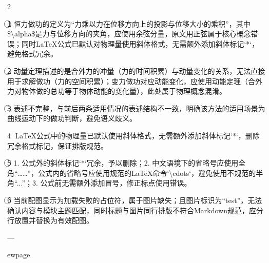 \documentclass[12pt,a4paper]{ctexart}
\newlength{\colwidthinner}
\newcommand{\calccolwidth}{%
  \setlength{\colwidthinner}{\dimexpr\linewidth-2\fboxsep-2\fboxrule\relax}%
}
\newcommand{\correctionbox}[1]{%
  \calccolwidth
  \colorbox{blue!8}{\parbox{\colwidthinner}{#1}}%
}
\begin{document}
\begin{paracol}{2}
\switchcolumn

\correctionbox{\textcircled{1} 恒力做功的定义为“力乘以力在位移方向上的投影与位移大小的乘积”，其中\$\textbackslash alpha\$是力与位移方向的夹角，应使用余弦分量，原文用正弦属于核心概念错误；同时LaTeX公式已默认对物理量使用斜体格式，无需额外添加斜体标记`*`，避免格式冗余。}
\medskip

\correctionbox{\textcircled{2} 动量定理描述的是合外力的冲量（力的时间积累）与动量变化的关系，无法直接用于求解做功（力的空间积累）；变力做功对应动能变化，应使用动能定理（合外力对物体做的总功等于物体动能的变化量），此处属于物理概念混淆。}
\medskip

\correctionbox{\textcircled{3} 表述不完整，与前后两条适用情况的表述结构不一致，明确该方法的适用场景为曲线运动下的做功判断，避免语义歧义。}
\medskip

\correctionbox{\textcircled{4} LaTeX公式中的物理量已默认使用斜体格式，无需额外添加斜体标记`*`，删除冗余格式标记，保证排版规范。}
\medskip

\correctionbox{\textcircled{5} 1. 公式外的斜体标记`*`冗余，予以删除；2. 中文语境下的省略号应使用全角“……”，公式内的省略号应使用规范的LaTeX命令`\textbackslash cdots`，避免使用不规范的半角“...”；3. 公式前无需额外添加冒号，修正标点使用错误。}
\medskip

\correctionbox{\textcircled{6} 当前配图显示为加载失败的占位符，属于图片缺失；且图片标识为“test”，无法确认内容与模块主题匹配，同时标题与图片同行排版不符合Markdown规范，应分行放置并替换为有效配图。

---}
\medskip

\switchcolumn*

\end{paracol}


ewpage
\end{document}
